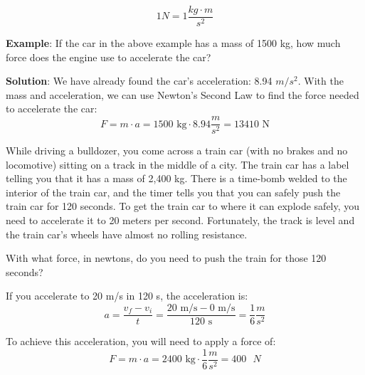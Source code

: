 $$1 N = 1 \frac{kg \cdot m}{s^2}$$

\textbf{Example}: If the car in the above example has a mass of 1500 kg, how much 
force does the engine use to accelerate the car?

\textbf{Solution}: We have already found the car's acceleration: 8.94 $m/s^2$. 
With the mass and acceleration, we can use Newton's Second Law to find the force 
needed to accelerate the car:
$$F = m \cdot a = 1500\text{ kg} \cdot 8.94 \frac{m}{s^2} = 13410\text{ N}$$

\begin{Exercise}[title={Acceleration}, label=acceleration_train]

While driving a bulldozer, you come across a train car (with no brakes
and no locomotive) sitting on a track in the middle of a city. The train car
has a label telling you that it has a mass of 2,400 kg. There is a time-bomb
welded to the interior of the train car, and the timer tells you that
you can safely push the train car for 120 seconds. To get the train
car to where it can explode safely, you need to accelerate it to 20 meters per
second. Fortunately, the track is level and the train car's wheels have
almost no rolling resistance.

With what force, in newtons, do you need to push the train for those 120 seconds?

\end{Exercise}
\begin{Answer}[ref=acceleration_train]
If you accelerate to 20 m/s in 120 s, the acceleration is:
$$a = \frac{v_f - v_i}{t} = \frac{20\text{ m/s} - 0\text{ m/s}}{120\text{ s}} = 
\frac{1}{6} \frac{m}{s^2}$$

To achieve this acceleration, you will need to apply a force of:
$$F = m \cdot a = 2400\text{ kg} \cdot \frac{1}{6} \frac{m}{s^2} = 400\text{ }N$$
\end{Answer}






